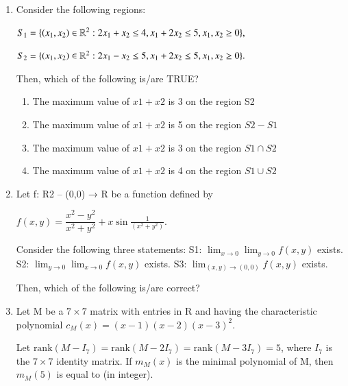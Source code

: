 \documentclass[journal,12pt,onecolumn]{IEEEtran}
\theoremstyle{remark}
\begin{document}
\begin{enumerate}
\item Consider the following regions:  

$S_1 = \{\left(x_1,x_2\right)\in \mathbb{R}^2 : 2x_1+x_2 \leq 4, x_1+2x_2 \leq 5, x_1,x_2 \geq 0\},$  

$S_2 = \{\left(x_1,x_2\right)\in \mathbb{R}^2 : 2x_1-x_2 \leq 5, x_1+2x_2 \leq 5, x_1,x_2 \geq 0\}.$  

Then, which of the following is/are TRUE?  

\begin{enumerate}
\item The maximum value of $x1+x2$ is 3 on the region S2
\item The maximum value of $x1+x2$ is 5 on the region $S2 - S1$
\item The maximum value of $x1+x2$ is 3 on the region $S1\cap S2$
\item The maximum value of $x1+x2$ is 4 on the region $S1\cup S2$
\end{enumerate}  
\hfill{}

\item Let f: R2 – {(0,0)} → R be a function defined by  

$f(x,y) = \dfrac{x^2-y^2}{x^2+y^2} + x \sin\frac{1}{(x^2+y^2)}.$  

Consider the following three statements:  
S1: $\lim_{x \to 0}\lim_{y \to 0} f(x,y)$ exists.  
S2: $\lim_{y \to 0}\lim_{x \to 0} f(x,y)$ exists.  
S3: $\lim_{(x,y)\to(0,0)} f(x,y)$ exists.  

Then, which of the following is/are correct?  

\begin{enumerate}
\end{enumerate}  
\hfill{}

\item Let M be a $7 \times 7$ matrix with entries in R and having the characteristic polynomial  
$c_M(x) = (x-1)(x-2)(x-3)^2.$  

Let $\text{rank}(M-I_7) = \text{rank}(M-2I_7) = \text{rank}(M-3I_7) = 5$, where $I_7$ is the $7 \times 7$ identity matrix.  
If $m_M(x)$ is the minimal polynomial of M, then $m_M(5)$ is equal to \underline{\hspace{2cm}} (in integer).  


\end{enumerate}
\end{document}
